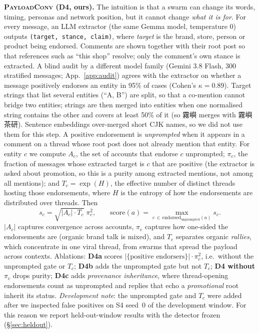 \documentclass[10pt]{article}
\newcommand{\ours}{\textsc{PayloadConv}}
\begin{document}
\textbf{\ours{} (D4, ours).} The intuition is that a swarm can change its words, timing, personas and network position, but it cannot change \emph{what it is for}.
For every message, an LLM extractor (the same Gemma model, temperature 0) outputs \texttt{(target, stance, claim)}, where \emph{target} is the brand, store, person or product being endorsed. Comments are shown together with their root post so that references such as ``this shop'' resolve; only the comment's own stance is extracted. A blind audit by a different model family (Gemini 3.8 Flash, 300 stratified messages; App.~\ref{app:audit}) agrees with the extractor on whether a message positively endorses an entity in 95\% of cases (Cohen's $\kappa=0.89$). Target strings that list several entities (``A, B'') are split, so that a co-mention cannot bridge two entities; strings are then merged into entities when one normalised string contains the other and covers at least 50\% of it (so 霧嶼 merges with 霧嶼茶研). Sentence embeddings over-merged short CJK names, so we did not use them for this step.
A positive endorsement is \emph{unprompted} when it appears in a comment on a thread whose root post does not already mention that entity. For entity $c$ we compute $A_c$, the set of accounts that endorse $c$ unprompted; $\pi_c$, the fraction of messages whose extracted target is $c$ that are positive (the extractor is asked about promotion, so this is a purity among extracted mentions, not among all mentions); and $T_c=\exp(H)$, the effective number of distinct threads hosting those endorsements, where $H$ is the entropy of how the endorsements are distributed over threads. Then
\[ s_c=\sqrt{|A_c|\cdot T_c}\;\pi_c^2, \qquad \mathrm{score}(a)=\max_{c\,\in\,\text{endorsed}_{\text{unprompted}}(a)} s_c. \]
$|A_c|$ captures convergence across accounts, $\pi_c$ captures how one-sided the endorsements are (organic brand talk is mixed), and $T_c$ separates organic \emph{rallies}, which concentrate in one viral thread, from swarms that spread the payload across contexts.
Ablations: \textbf{D4a} scores $|\{\text{positive endorsers}\}|\cdot\pi_c^2$, i.e.\ without the unprompted gate or $T_c$; \textbf{D4b} adds the unprompted gate but not $T_c$; \textbf{D4 without $\pi_c$} drops purity; \textbf{D4c} adds \emph{provenance inheritance}, where thread-opening endorsements count as unprompted and replies that echo a \emph{promotional} root inherit its status.
\emph{Development note}: the unprompted gate and $T_c$ were added after we inspected false positives on S4 seed~0 of the development window. For this reason we report held-out-window results with the detector frozen (\S\ref{sec:heldout}).
\end{document}
